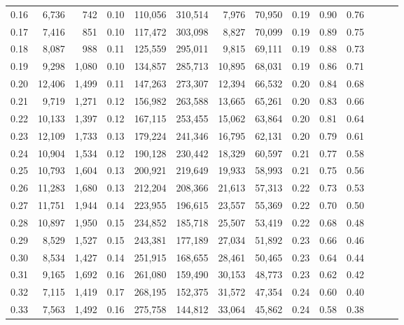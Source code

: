 \begin{tabular}{rrrrrrrrrrrrrr}
0.16 &   6,736 &    742 &  0.10 &  110,056 &  310,514 &   7,976 &  70,950 &  0.19 &  0.90 &      0.76 \\
0.17 &   7,416 &    851 &  0.10 &  117,472 &  303,098 &   8,827 &  70,099 &  0.19 &  0.89 &      0.75 \\
0.18 &   8,087 &    988 &  0.11 &  125,559 &  295,011 &   9,815 &  69,111 &  0.19 &  0.88 &      0.73 \\
0.19 &   9,298 &  1,080 &  0.10 &  134,857 &  285,713 &  10,895 &  68,031 &  0.19 &  0.86 &      0.71 \\
0.20 &  12,406 &  1,499 &  0.11 &  147,263 &  273,307 &  12,394 &  66,532 &  0.20 &  0.84 &      0.68 \\
0.21 &   9,719 &  1,271 &  0.12 &  156,982 &  263,588 &  13,665 &  65,261 &  0.20 &  0.83 &      0.66 \\
0.22 &  10,133 &  1,397 &  0.12 &  167,115 &  253,455 &  15,062 &  63,864 &  0.20 &  0.81 &      0.64 \\
0.23 &  12,109 &  1,733 &  0.13 &  179,224 &  241,346 &  16,795 &  62,131 &  0.20 &  0.79 &      0.61 \\
0.24 &  10,904 &  1,534 &  0.12 &  190,128 &  230,442 &  18,329 &  60,597 &  0.21 &  0.77 &      0.58 \\
0.25 &  10,793 &  1,604 &  0.13 &  200,921 &  219,649 &  19,933 &  58,993 &  0.21 &  0.75 &      0.56 \\
0.26 &  11,283 &  1,680 &  0.13 &  212,204 &  208,366 &  21,613 &  57,313 &  0.22 &  0.73 &      0.53 \\
0.27 &  11,751 &  1,944 &  0.14 &  223,955 &  196,615 &  23,557 &  55,369 &  0.22 &  0.70 &      0.50 \\
0.28 &  10,897 &  1,950 &  0.15 &  234,852 &  185,718 &  25,507 &  53,419 &  0.22 &  0.68 &      0.48 \\
0.29 &   8,529 &  1,527 &  0.15 &  243,381 &  177,189 &  27,034 &  51,892 &  0.23 &  0.66 &      0.46 \\
0.30 &   8,534 &  1,427 &  0.14 &  251,915 &  168,655 &  28,461 &  50,465 &  0.23 &  0.64 &      0.44 \\
0.31 &   9,165 &  1,692 &  0.16 &  261,080 &  159,490 &  30,153 &  48,773 &  0.23 &  0.62 &      0.42 \\
0.32 &   7,115 &  1,419 &  0.17 &  268,195 &  152,375 &  31,572 &  47,354 &  0.24 &  0.60 &      0.40 \\
0.33 &   7,563 &  1,492 &  0.16 &  275,758 &  144,812 &  33,064 &  45,862 &  0.24 &  0.58 &      0.38 \\

\end{tabular}
